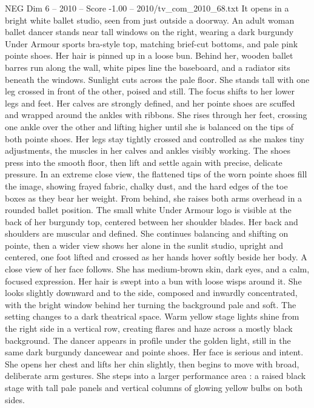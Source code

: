 \begin{textsample}{NEG Dim 6 – 2010 – Score -1.00 – 2010/tv\_com\_2010\_68.txt}  \label{ex:f6_neg_014}
It opens in a bright white ballet studio, seen from just outside a doorway.
An adult woman ballet dancer stands near tall windows on the right, wearing a dark burgundy Under Armour sports bra-style top, matching brief-cut bottoms, and pale pink pointe shoes.
Her hair is pinned up in a loose bun.
Behind her, wooden ballet barres run along the wall, white pipes line the baseboard, and a radiator sits beneath the windows.
Sunlight cuts across the pale floor.
She stands tall with one leg crossed in front of the other, poised and still.
The focus shifts to her lower legs and feet.
Her calves are strongly defined, and her pointe shoes are scuffed and wrapped around the ankles with ribbons.
She rises through her feet, crossing one ankle over the other and lifting higher until she is balanced on the tips of both pointe shoes.
Her legs stay tightly crossed and controlled as she makes tiny adjustments, the muscles in her calves and ankles visibly working.
The shoes press into the smooth floor, then lift and settle again with precise, delicate pressure.
In an extreme close view, the flattened tips of the worn pointe shoes fill the image, showing frayed fabric, chalky dust, and the hard edges of the toe boxes as they bear her weight.
From behind, she raises both arms overhead in a rounded ballet position.
The small white Under Armour logo is visible at the back of her burgundy top, centered between her shoulder blades.
Her back and shoulders are muscular and defined.
She continues balancing and shifting on pointe, then a wider view shows her alone in the sunlit studio, upright and centered, one foot lifted and crossed as her hands hover softly beside her body.
A close view of her face follows.
She has medium-brown skin, dark eyes, and a calm, focused expression.
Her hair is swept into a bun with loose wisps around it.
She looks slightly downward and to the side, composed and inwardly concentrated, with the bright window behind her turning the background pale and soft.
The setting changes to a dark theatrical space.
Warm yellow stage lights shine from the right side in a vertical row, creating flares and haze across a mostly black background.
The dancer appears in profile under the golden light, still in the same dark burgundy dancewear and pointe shoes.
Her face is serious and intent.
She opens her chest and lifts her chin slightly, then begins to move with broad, deliberate arm gestures.
She steps into a larger performance area : a raised black stage with tall pale panels and vertical columns of glowing yellow bulbs on both sides.

\end{textsample}

